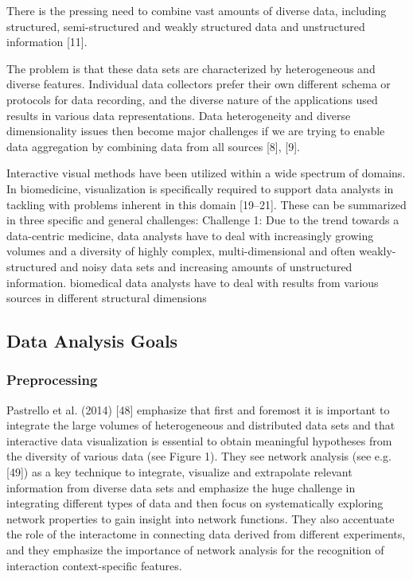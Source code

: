 \documentclass[10pt,a4paper]{article}
\begin{document}
	There is the pressing need to combine vast amounts of diverse data, including
	structured, semi-structured and weakly structured data and unstructured information
	[11]. \cite{Holzinger2014}
	
	The problem is that these data sets are characterized by heterogeneous and
	diverse features. Individual data collectors prefer their own different schema or
	protocols for data recording, and the diverse nature of the applications used results in
	various data representations. Data heterogeneity and diverse
	dimensionality issues then become major challenges if we are trying to enable data
	aggregation by combining data from all sources [8], [9]. \cite{Otasek2014}
	
	
	Interactive visual methods have been utilized within a wide spectrum of domains.
	In biomedicine, visualization is specifically required to support data analysts in
	tackling with problems inherent in this domain [19–21]. These can be summarized
	in three specific and general challenges:
	Challenge 1: Due to the trend towards a data-centric medicine, data analysts
	have to deal with increasingly growing volumes and a diversity of highly complex,
	multi-dimensional and often weakly-structured and noisy data sets and
	increasing amounts of unstructured information. biomedical data analysts have to deal with results from various sources in different
	structural dimensions \cite{Turkay2014}
	
	\subsection{Data Analysis Goals}
	
	\subsubsection{Preprocessing}
	
	Pastrello et al. (2014) [48] emphasize that first and foremost it is important to
	integrate the large volumes of heterogeneous and distributed data sets and that
	interactive data visualization is essential to obtain meaningful hypotheses from the
	diversity of various data (see Figure 1). They see network analysis (see e.g. [49]) as
	a key technique to integrate, visualize and extrapolate relevant information from
	diverse data sets and emphasize the huge challenge in integrating different types of
	data and then focus on systematically exploring network properties to gain insight
	into network functions. They also accentuate the role of the interactome in connecting
	data derived from different experiments, and they emphasize the importance of
	network analysis for the recognition of interaction context-specific features. \cite{Holzinger2014}
	
\end{document}
